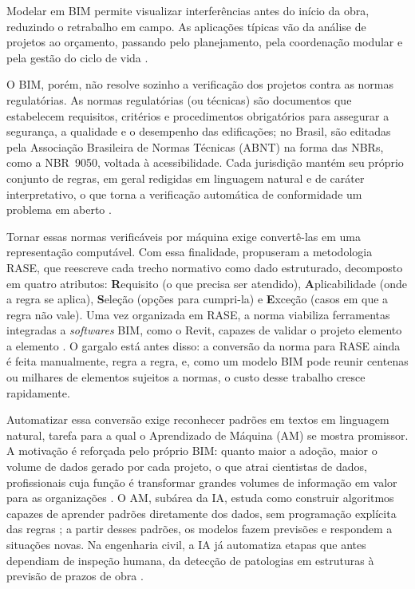 \documentclass[a4paper,fleqn]{cas-sc}
\begin{document}
Modelar em BIM permite visualizar interferências antes do início da obra, reduzindo o retrabalho em campo. As aplicações típicas vão da análise de projetos ao orçamento, passando pelo planejamento, pela coordenação modular e pela gestão do ciclo de vida \citep{eastman2011}.

O BIM, porém, não resolve sozinho a verificação dos projetos contra as normas regulatórias. As normas regulatórias (ou técnicas) são documentos que estabelecem requisitos, critérios e procedimentos obrigatórios para assegurar a segurança, a qualidade e o desempenho das edificações; no Brasil, são editadas pela Associação Brasileira de Normas Técnicas (ABNT) na forma das NBRs, como a NBR~9050, voltada à acessibilidade. Cada jurisdição mantém seu próprio conjunto de regras, em geral redigidas em linguagem natural e de caráter interpretativo, o que torna a verificação automática de conformidade um problema em aberto \citep{dimyadi2013,solihin2015}.

Tornar essas normas verificáveis por máquina exige convertê-las em uma representação computável. Com essa finalidade, \citet{hjelseth2011} propuseram a metodologia RASE, que reescreve cada trecho normativo como dado estruturado, decomposto em quatro atributos: \textbf{R}equisito (o que precisa ser atendido), \textbf{A}plicabilidade (onde a regra se aplica), \textbf{S}eleção (opções para cumpri-la) e \textbf{E}xceção (casos em que a regra não vale). Uma vez organizada em RASE, a norma viabiliza ferramentas integradas a \textit{softwares} BIM, como o Revit, capazes de validar o projeto elemento a elemento \citep{santos2021}. O gargalo está antes disso: a conversão da norma para RASE ainda é feita manualmente, regra a regra, e, como um modelo BIM pode reunir centenas ou milhares de elementos sujeitos a normas, o custo desse trabalho cresce rapidamente.

Automatizar essa conversão exige reconhecer padrões em textos em linguagem natural, tarefa para a qual o Aprendizado de Máquina (AM) se mostra promissor. A motivação é reforçada pelo próprio BIM: quanto maior a adoção, maior o volume de dados gerado por cada projeto, o que atrai cientistas de dados, profissionais cuja função é transformar grandes volumes de informação em valor para as organizações \citep{davenport2012}. O AM, subárea da IA, estuda como construir algoritmos capazes de aprender padrões diretamente dos dados, sem programação explícita das regras \citep{tan2006}; a partir desses padrões, os modelos fazem previsões e respondem a situações novas. Na engenharia civil, a IA já automatiza etapas que antes dependiam de inspeção humana, da detecção de patologias em estruturas à previsão de prazos de obra \citep{rane2023,liu2022}.
\end{document}
